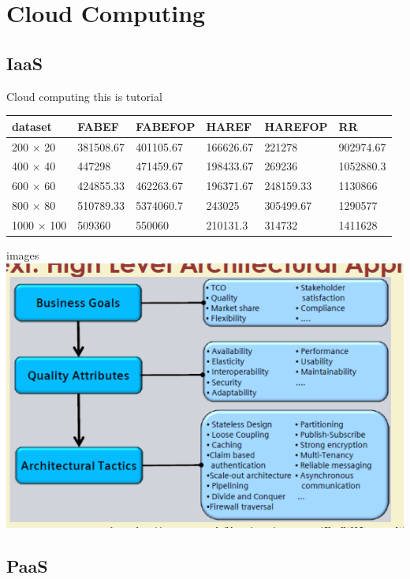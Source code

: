 \documentclass{SKP-beamer}
\begin{document}
\section{Cloud Computing}
\subsection{IaaS}
\begin{frame}{Cloud computing}
this is tutorial
\begin{table}[]
	\begin{tabular}{|l|l|l|l|l|l|}
		\hline
		\rowcolor[HTML]{FE0000} 
		dataset    & FABEF     & FABEFOP   & HAREF     & HAREFOP   & RR        \\ \hline
		200 × 20   & 381508.67 & 401105.67 & 166626.67 & 221278    & 902974.67 \\ \hline
		400 × 40   & 447298    & 471459.67 & 198433.67 & 269236    & 1052880.3 \\ \hline
		600 × 60   & 424855.33 & 462263.67 & 196371.67 & 248159.33 & 1130866   \\ \hline
		800 × 80   & 510789.33 & 5374060.7 & 243025    & 305499.67 & 1290577   \\ \hline
		1000 × 100 & 509360    & 550060    & 210131.3  & 314732    & 1411628   \\ \hline
	\end{tabular}
\end{table}
\end{frame}
\begin{frame}{images}
\includegraphics[scale=0.5]{89.png}
\end{frame}


\subsection{PaaS}
\end{document}
